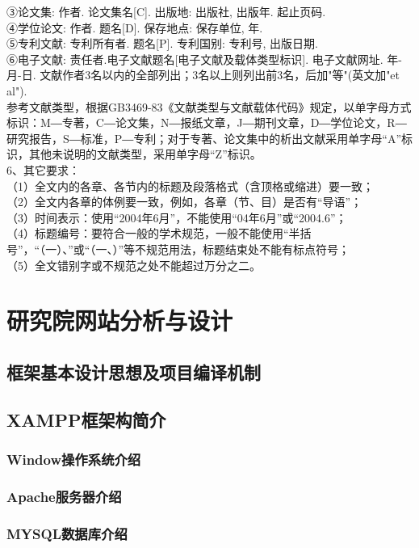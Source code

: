\documentclass{xmuthesis}
\begin{document}
\begin{flushleft}
    ③论文集: 作者. 论文集名[C]. 出版地: 出版社, 出版年. 起止页码.\\
    ④学位论文: 作者. 题名[D]. 保存地点: 保存单位, 年.\\
    ⑤专利文献: 专利所有者. 题名[P]. 专利国别: 专利号, 出版日期.\\
    ⑥电子文献: 责任者.电子文献题名[电子文献及载体类型标识]. 电子文献网址. 年-月-日. 文献作者3名以内的全部列出；3名以上则列出前3名，后加"等"(英文加"et al").\\
    参考文献类型，根据GB3469-83《文献类型与文献载体代码》规定，以单字母方式标识：M―专著，C―论文集，N―报纸文章，J―期刊文章，D―学位论文，R―研究报告，S―标准，P―专利；对于专著、论文集中的析出文献采用单字母“A”标识，其他未说明的文献类型，采用单字母“Z”标识。\\
    6、其它要求：\\
   （1）全文内的各章、各节内的标题及段落格式（含顶格或缩进）要一致；\\
   （2）全文内各章的体例要一致，例如，各章（节、目）是否有“导语”；\\
   （3）时间表示：使用“2004年6月”，不能使用“04年6月”或“2004.6”；\\
   （4）标题编号：要符合一般的学术规范，一般不能使用“半括号”，“（一）、”或“（一、）”等不规范用法，标题结束处不能有标点符号；\\
   （5）全文错别字或不规范之处不能超过万分之二。\\
\newpage
\chapter{研究院网站分析与设计}

\section{框架基本设计思想及项目编译机制}
\section{XAMPP框架构简介}
\subsection{Window操作系统介绍}
\subsection{Apache服务器介绍}
\subsection{MYSQL数据库介绍}

\end{flushleft}
\end{document}
